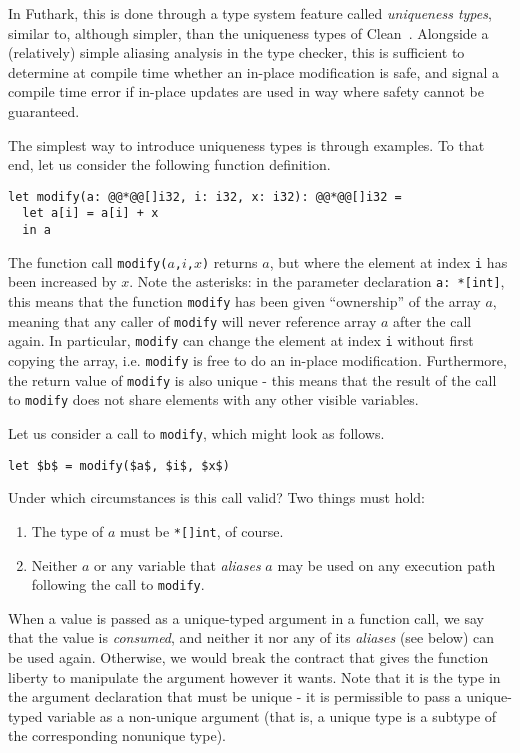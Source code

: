 \documentclass[oneside,11pt]{book}
\begin{document}
In Futhark, this is done through a type system feature called
\textit{uniqueness types}, similar to, although simpler, than the
uniqueness types of
Clean~\cite{clean-uniqueness-types,barendsen1996uniqueness}.
Alongside a (relatively) simple aliasing analysis in the type checker,
this is sufficient to determine at compile time whether an in-place
modification is safe, and signal a compile time error if in-place
updates are used in way where safety cannot be guaranteed.

The simplest way to introduce uniqueness types is through examples.
To that end, let us consider the following function definition.

\begin{lstlisting}
let modify(a: @@*@@[]i32, i: i32, x: i32): @@*@@[]i32 =
  let a[i] = a[i] + x
  in a
\end{lstlisting}

The function call \texttt{modify($a$,$i$,$x$)} returns $a$, but where
the element at index \texttt{i} has been increased by $x$.  Note the
asterisks: in the parameter declaration \texttt{a: *[int]}, this means
that the function \texttt{modify} has been given ``ownership'' of the
array $a$, meaning that any caller of \texttt{modify} will never
reference array $a$ after the call again.  In particular,
\texttt{modify} can change the element at index \texttt{i} without
first copying the array, i.e. \texttt{modify} is free to do an
in-place modification.  Furthermore, the return value of
\texttt{modify} is also unique - this means that the result of the
call to \texttt{modify} does not share elements with any other visible
variables.

Let us consider a call to \texttt{modify}, which might look as
follows.

\begin{lstlisting}[mathescape=true]
let $b$ = modify($a$, $i$, $x$)
\end{lstlisting}

Under which circumstances is this call valid?  Two things must hold:
\begin{enumerate}
\item The type of \texttt{$a$} must be \texttt{*[]int}, of course.

\item Neither \texttt{$a$} or any variable that \textit{aliases}
  \texttt{$a$} may be used on any execution path following the call to
  \texttt{modify}.
\end{enumerate}

When a value is passed as a unique-typed argument in a function call,
we say that the value is \textit{consumed}, and neither it nor any of
its \textit{aliases} (see below) can be used again.  Otherwise, we
would break the contract that gives the function liberty to manipulate
the argument however it wants.  Note that it is the type in the
argument declaration that must be unique - it is permissible to pass a
unique-typed variable as a non-unique argument (that is, a unique type
is a subtype of the corresponding nonunique type).
\end{document}
